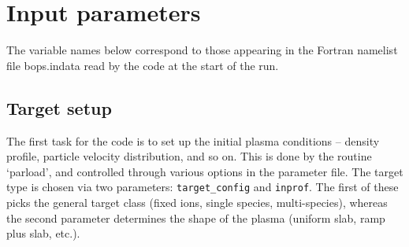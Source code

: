 \documentclass[11pt]{article}
\begin{document}
\section{Input parameters} 

The variable names below correspond to those appearing in the Fortran namelist file bops.indata read by the code at the start of the run. 
 
\subsection{Target setup}

The first task for the code is to set up the initial plasma conditions -- density profile, 
particle velocity distribution, and so on.   This is done by the routine `parload', and controlled through
various options in the parameter file.  The target type is chosen via two parameters: \texttt{target\_config} and \texttt{inprof}.   The first of these picks the general target class (fixed ions, single species, multi-species), whereas the second parameter determines the shape of the plasma (uniform slab, ramp plus slab, etc.).
\end{document}
